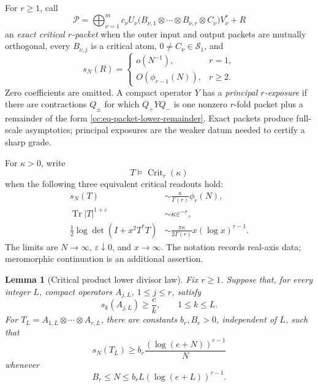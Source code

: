 \documentclass[10pt,reqno]{amsart}
\theoremstyle{plain}
\newtheorem{lemma}[theorem]{Lemma}
\theoremstyle{definition}
\theoremstyle{remark}
\begin{document}
For \(r\ge1\), call
\begin{equation}
 \mathcal P=
 \bigoplus_{\nu=1}^m c_\nu U_\nu
 \bigl(B_{\nu,1}\otimes\cdots\otimes B_{\nu,r}\otimes C_\nu\bigr)
 V_\nu^*+R
 \label{cc:eq-exact-critical-packet}
\end{equation}
an \emph{exact critical \(r\)-packet} when the outer input and output
packets are mutually orthogonal, every \(B_{\nu,j}\) is a critical atom,
\(0\ne C_\nu\in\mathcal S_1\), and
\begin{equation}
 s_N(R)=
 \begin{cases}
  o(N^{-1}),&r=1,\\
  O(\phi_{r-1}(N)),&r\ge2.
 \end{cases}
 \label{cc:eq-packet-lower-remainder}
\end{equation}
Zero coefficients are omitted.  A compact operator \(Y\) has a
\emph{principal \(r\)-exposure} if there are contractions \(Q_\pm\) for
which \(Q_+YQ_-\) is one nonzero \(r\)-fold packet plus a remainder of the
form \eqref{cc:eq-packet-lower-remainder}.  Exact packets produce full-scale
asymptotics; principal exposures are the weaker datum needed to certify a
sharp grade.

For \(\kappa>0\), write
\begin{equation}
 T\models\operatorname{Crit}_r(\kappa)
 \label{cc:eq-exact-critical-law-notation}
\end{equation}
when the following three equivalent critical readouts hold:
\begin{align}
 s_N(T)
 &\sim\frac{\kappa}{\Gamma(r)}\phi_r(N),
 \label{cc:eq-packet-singular}\\
 \operatorname{Tr}|T|^{1+\varepsilon}
 &\sim\kappa\varepsilon^{-r},
 \label{cc:eq-packet-mellin}\\
 \frac12\log\det(I+x^2T^*T)
 &\sim\frac{\pi\kappa}{2\Gamma(r)}
 x(\log x)^{r-1}.
 \label{cc:eq-packet-fredholm}
\end{align}
The limits are \(N\to\infty\), \(\varepsilon\downarrow0\), and
\(x\to\infty\).  The notation records real-axis data; meromorphic
continuation is an additional assertion.

\begin{lemma}[Critical product lower divisor law]
\label{cc:gen-lemma-divisor-lower}
Fix \(r\geq1\).  Suppose that, for every integer \(L\), compact
operators \(A_{j,L}\), \(1\leq j\leq r\), satisfy
\[
 s_k(A_{j,L})\geq\frac{c}{k},
 \qquad 1\leq k\leq L.
\]
For \(T_L=A_{1,L}\otimes\cdots\otimes A_{r,L}\), there are constants
\(b_r,B_r>0\), independent of \(L\), such that
\begin{equation}
 s_N(T_L)\geq b_r\frac{(\log(e+N))^{r-1}}{N}
 \label{cc:gen-divisor-lower}
\end{equation}
whenever
\[
 B_r\leq N\leq b_rL(\log(e+L))^{r-1}.
\]
\end{lemma}
\end{document}
